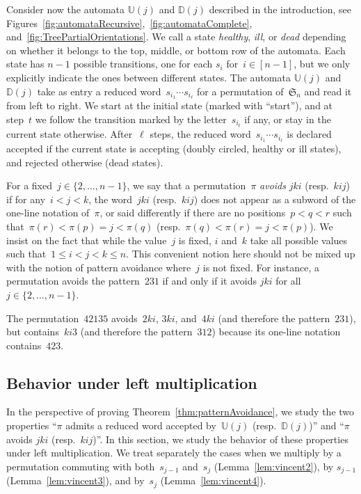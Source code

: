 \documentclass[ALCO]{cedram}
\newcommand{\fS}{\mathfrak{S}}
\newcommand{\defn}[1]{\textsl{\color{darkblue} #1}}
\newcommand{\automatonU}{\mathbb{U}}
\newcommand{\automatonD}{\mathbb{D}}
\begin{document}
Consider now the automata $\automatonU(j)$ and $\automatonD(j)$ described in the introduction, see Figures~\ref{fig:automataRecursive},~\ref{fig:automataComplete}, and~\ref{fig:TreePartialOrientations}.
We call a state \defn{healthy}, \defn{ill}, or \defn{dead} depending on whether it belongs to the top, middle, or bottom row of the automata.
Each state has $n-1$ possible transitions, one for each $s_i$ for~$i \in [n-1]$, but we only explicitly indicate the ones between different states.
The automata $\automatonU(j)$ and $\automatonD(j)$ take as entry a reduced word~$s_{i_1} \cdots s_{i_\ell}$ for a permutation of~$\fS_n$ and read it from left to right.
We start at the initial state (marked with ``start''), and at step~$t$ we follow the transition marked by the letter~$s_{i_t}$ if any, or stay in the current state otherwise.
After~$\ell$ steps, the reduced word~$s_{i_1} \cdots s_{i_\ell}$ is declared accepted if the current state is accepting (doubly circled, healthy or ill states), and rejected otherwise (dead states).

For a fixed~$j \in \{2, \dots, n-1\}$, we say that a permutation~$\pi$ \defn{avoids} $jki$ (resp.~$kij$) if for any~$i < j < k$, the word~$jki$ (resp.~$kij$) does not appear as a subword of the one-line notation of~$\pi$, or said differently if there are no positions~$p < q < r$ such that~$\pi(r) < \pi(p) = j < \pi(q)$ (resp.~$\pi(q) < \pi(r) = j < \pi(p)$).
We insist on the fact that while the value~$j$ is fixed, $i$ and~$k$ take all possible values such that~$1 \le i < j < k \le n$.
This convenient notion here should not be mixed up with the notion of pattern avoidance where~$j$ is not fixed.
For instance, a permutation avoids the pattern~$231$ if and only if it avoids $jki$ for all~$j \in \{2, \dots, n-1\}$.

\begin{example}\label{exm:patternAvoidance}
	The permutation~$42135$ avoids~$2ki$, $3ki$, and~$4ki$ (and therefore the pattern~$231$), but contains~$ki3$ (and therefore the pattern~$312$) because its one-line notation contains~$423$. 
\end{example}

\subsection{Behavior under left multiplication}

In the perspective of proving Theorem~\ref{thm:patternAvoidance}, we study the two properties ``$\pi$ admits a reduced word accepted by~$\automatonU(j)$ (resp.~$\automatonD(j)$)'' and ``$\pi$ avoids $jki$ (resp.~$kij$)''.
In this section, we study the behavior of these properties under left multiplication.
We treat separately the cases when we multiply by a permutation commuting with both~$s_{j-1}$ and~$s_j$ (Lemma~\ref{lem:vincent2}), by $s_{j-1}$ (Lemma~\ref{lem:vincent3}), and by~$s_j$ (Lemma~\ref{lem:vincent4}).
\end{document}
